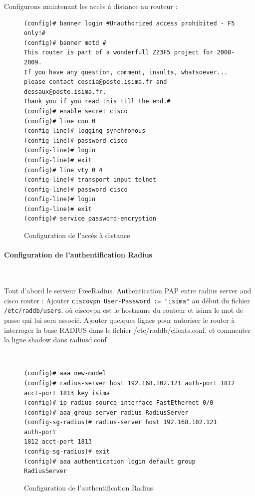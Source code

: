 Configurons maintenant les accès à distance au routeur :
\begin{figure}[H]
	\begin{center}
		\begin{minipage}{0.95\textwidth}
			\begin{lstlisting}[frame=trBL]
(config)# banner login #Unauthorized access prohibited - F5 only!#
(config)# banner motd #
This router is part of a wonderfull ZZ3F5 project for 2008-2009.
If you have any question, comment, insults, whatsoever...
please contact coscia@poste.isima.fr and dessaux@poste.isima.fr.
Thank you if you read this till the end.#
(config)# enable secret cisco
(config)# line con 0
(config-line)# logging synchronous
(config-line)# password cisco
(config-line)# login
(config-line)# exit
(config)# line vty 0 4
(config-line)# transport input telnet
(config-line)# password cisco
(config-line)# login
(config-line)# exit
(config)# service password-encryption
			\end{lstlisting}
		\end{minipage}
	\end{center}
	\caption{Configuration de l'accès à distance}
	\label{configuration_acces_a_distance}
\end{figure}

\paragraph{Configuration de l'authentification Radius}
~

Tout d'abord le serveur FreeRadius.
Authentication PAP entre radius server and cisco router :
Ajouter \verb|ciscovpn User-Password := "isima"|  au début du fichier \verb|/etc/raddb/users|, où ciscovpn est le hostname du routeur et isima le mot de passe qui lui sera associé.
Ajouter quelques lignes pour autoriser le router à interroger la base RADIUS dans le fichier /etc/raddb/clients.conf, et commenter la ligne shadow dans radiusd.conf

~


\begin{figure}[H]
	\begin{center}
		\begin{minipage}{0.90\textwidth}
			\begin{lstlisting}[frame=trBL]
(config)# aaa new-model
(config)# radius-server host 192.168.102.121 auth-port 1812
acct-port 1813 key isima
(config)# ip radius source-interface FastEthernet 0/0
(config)# aaa group server radius RadiusServer
(config-sg-radius)# radius-server host 192.168.102.121 auth-port
1812 acct-port 1813
(config-sg-radius)# exit
(config)# aaa authentication login default group RadiusServer
			\end{lstlisting}
		\end{minipage}
	\end{center}
	\caption{Configuration de l'authentification Radius}
	\label{configuration_authentification_radius}
\end{figure}


